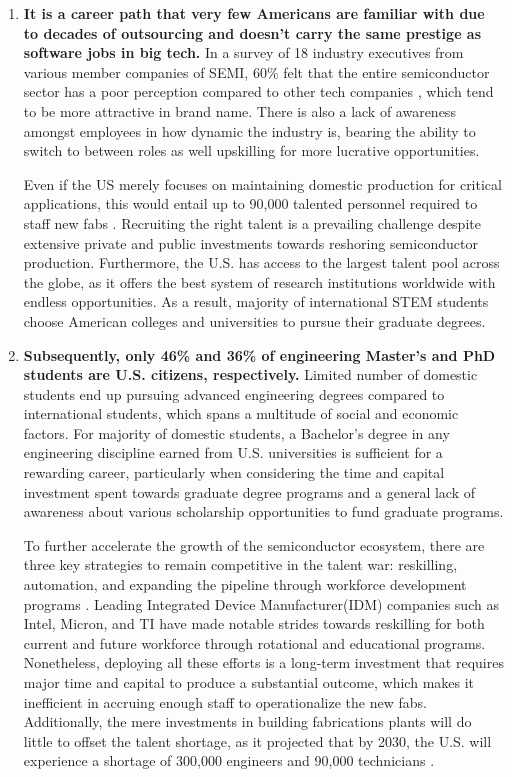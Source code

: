 \begin{enumerate}
\item \textbf{It is a career path that very few Americans are familiar with due to decades of outsourcing and doesn’t carry the same prestige as software jobs in big tech.} In a survey of 18 industry executives from various member companies of SEMI, 60\% felt that the entire semiconductor sector has a poor perception compared to other tech companies \cite{deloitte}, which tend to be more attractive in brand name. There is also a lack of awareness amongst employees in how dynamic the industry is, bearing the ability to switch to between roles as well upskilling for more lucrative opportunities. 

Even if the US merely focuses on maintaining domestic production for critical applications, this would entail up to 90,000 talented personnel required to staff new fabs \cite{Alam2023-hc}. Recruiting the right talent is a prevailing challenge despite extensive private and public investments towards reshoring semiconductor production. Furthermore, the U.S. has access to the largest talent pool across the globe, as it offers the best system of research institutions worldwide with endless opportunities. As a result, majority of international STEM students choose American colleges and universities to pursue their graduate degrees. 

\item \textbf{Subsequently, only 46\% and 36\% of engineering Master's and PhD students are U.S. citizens, respectively.} Limited number of domestic students end up pursuing advanced engineering degrees compared to international students, which spans a multitude of social and economic factors. For majority of domestic students, a Bachelor’s degree in any engineering discipline earned from U.S. universities is sufficient for a rewarding career, particularly when considering the time and capital investment spent towards graduate degree programs and a general lack of awareness about various scholarship opportunities to fund graduate programs.

To further accelerate the growth of the semiconductor 
ecosystem, there are three key strategies to remain
competitive in the talent war: reskilling, automation, and
expanding the pipeline through workforce development programs \cite{Alam2023-hc}. Leading Integrated Device Manufacturer(IDM) companies such as Intel, Micron, and TI have made notable strides towards reskilling for both current and future workforce through rotational and educational programs. Nonetheless, deploying all these efforts is a long-term investment that requires major time and capital to produce a substantial outcome, which makes it inefficient in accruing enough staff to operationalize the new fabs. Additionally, the mere investments in building fabrications plants will do little to offset the talent shortage, as it projected that by 2030, the U.S. will experience a shortage of 300,000 engineers and 90,000 technicians \cite{Alam2023-hc}. 


\end{enumerate}
